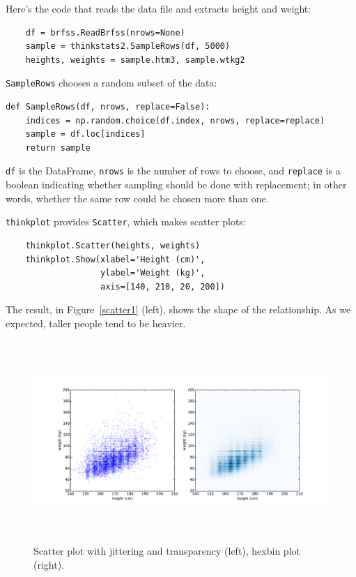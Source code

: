 \documentclass[12pt]{book}
\begin{document}
Here's the code that reads the data file and extracts height and
weight:

\begin{verbatim}
    df = brfss.ReadBrfss(nrows=None)
    sample = thinkstats2.SampleRows(df, 5000)
    heights, weights = sample.htm3, sample.wtkg2
\end{verbatim}

{\tt SampleRows} chooses a random subset of the data:

\begin{verbatim}
def SampleRows(df, nrows, replace=False):
    indices = np.random.choice(df.index, nrows, replace=replace)
    sample = df.loc[indices]
    return sample
\end{verbatim}

{\tt df} is the DataFrame, {\tt nrows} is the number of rows to choose,
and {\tt replace} is a boolean indicating whether sampling should be
done with replacement; in other words, whether the same row could be
chosen more than one.

{\tt thinkplot} provides {\tt Scatter}, which makes scatter plots:
%
\begin{verbatim}
    thinkplot.Scatter(heights, weights)
    thinkplot.Show(xlabel='Height (cm)',
                   ylabel='Weight (kg)',
                   axis=[140, 210, 20, 200])
\end{verbatim}

The result, in Figure~\ref{scatter1} (left), shows the shape of
the relationship.  As we expected, taller
people tend to be heavier.  

\begin{figure}
\centerline{\includegraphics[height=3.0in]{figs/scatter2.pdf}}
\caption{Scatter plot with jittering and transparency (left),
hexbin plot (right).}
\label{scatter2}
\end{figure}
\end{document}
